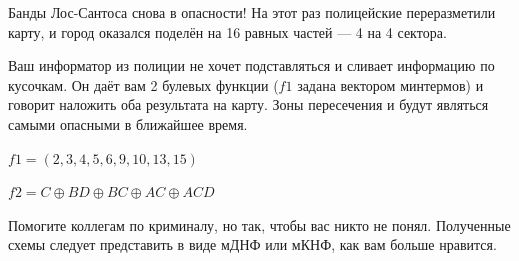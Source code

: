 \question
Банды Лос-Сантоса снова в опасности! На этот раз полицейские переразметили карту, и город оказался поделён на 16 равных частей — 4 на 4 сектора.

Ваш информатор из полиции не хочет подставляться и сливает информацию по кусочкам. Он даёт вам 2 булевых функции ($f1$ задана вектором минтермов) и говорит наложить оба результата на карту. Зоны пересечения и будут являться самыми опасными в ближайшее время.

\begin{center}
$f1=(2,3,4,5,6,9,10,13,15)$

$f2=C \oplus BD \oplus BC \oplus AC \oplus ACD$
\end{center}

Помогите коллегам по криминалу, но так, чтобы вас никто не понял. Полученные схемы следует представить в виде мДНФ или мКНФ, как вам больше нравится.
